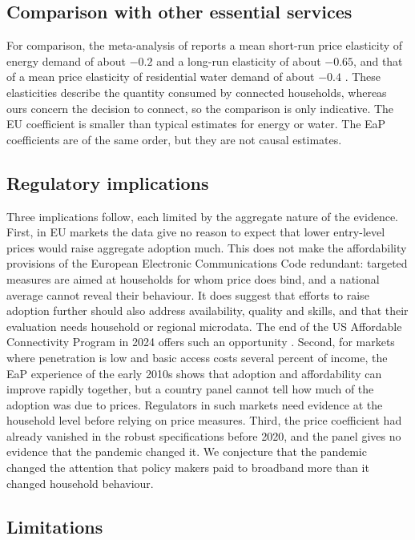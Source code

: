 \documentclass[pdflatex,sn-basic]{sn-jnl}
\begin{document}
\subsection{Comparison with other essential services}

For comparison, the meta-analysis of \citet{labandeira2017meta} reports a mean short-run price elasticity of energy demand of about $-0.2$ and a long-run elasticity of about $-0.65$, and that of \citet{dalhuisen2003price} a mean price elasticity of residential water demand of about $-0.4$ \citep[see also][]{espey2004turn}. These elasticities describe the quantity consumed by connected households, whereas ours concern the decision to connect, so the comparison is only indicative. The EU coefficient is smaller than typical estimates for energy or water. The EaP coefficients are of the same order, but they are not causal estimates.

\subsection{Regulatory implications}

Three implications follow, each limited by the aggregate nature of the evidence. First, in EU markets the data give no reason to expect that lower entry-level prices would raise aggregate adoption much. This does not make the affordability provisions of the European Electronic Communications Code redundant: targeted measures are aimed at households for whom price does bind, and a national average cannot reveal their behaviour. It does suggest that efforts to raise adoption further should also address availability, quality and skills, and that their evaluation needs household or regional microdata. The end of the US Affordable Connectivity Program in 2024 offers such an opportunity \citep{fcc_acp}. Second, for markets where penetration is low and basic access costs several percent of income, the EaP experience of the early 2010s shows that adoption and affordability can improve rapidly together, but a country panel cannot tell how much of the adoption was due to prices. Regulators in such markets need evidence at the household level before relying on price measures. Third, the price coefficient had already vanished in the robust specifications before 2020, and the panel gives no evidence that the pandemic changed it. We conjecture that the pandemic changed the attention that policy makers paid to broadband more than it changed household behaviour.

\subsection{Limitations}
\end{document}
